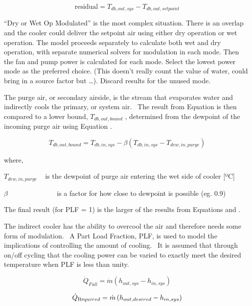 \begin{equation}
\text{residual} = T_{db,out,sys} - T_{db,out,setpoint}
\end{equation}

``Dry or Wet Op Modulated'' is the most complex situation. There is an overlap and the cooler could deliver the setpoint air using either dry operation or wet operation. The model proceeds separately to calculate both wet and dry operation, with separate numerical solvers for modulation in each mode. Then the fan and pump power is calculated for each mode. Select the lowest power mode as the preferred choice. (This doesn't really count the value of water, could bring in a source factor but \ldots{}). Discard results for the unused mode.

The purge air, or secondary airside, is the stream that evaporates water and indirectly cools the primary, or system air.~ The result from Equation is then compared to a lower bound, \({T_{db,out,bound}}\) , determined from the dewpoint of the incoming purge air using Equation .

\begin{equation}
{T_{db,out,bound}} = {T_{db,in,sys}} - \beta ({T_{db,in,sys}} - {T_{dew,in,purge}})
\end{equation}

where,

\({T_{dew,in,purge}}\) ~ is the dewpoint of purge air entering the wet side of cooler {[}ºC{]}

\(\beta\) ~~~~~~~~~~~~~ is a factor for how close to dewpoint is possible (eg. 0.9)

The final result (for PLF = 1) is the larger of the results from Equations and .

The indirect cooler has the ability to overcool the air and therefore needs some form of modulation.~ A Part Load Fraction, PLF, is used to model the implications of controlling the amount of cooling.~ It is assumed that through on/off cycling that the cooling power can be varied to exactly meet the desired temperature when PLF is less than unity.

\begin{equation}
{\dot Q_{Full}} = \dot m\left( {{h_{out,sys}} - {h_{in,sys}}} \right)
\end{equation}

\begin{equation}
{\dot Q_{{\mathop{\rm Re}\nolimits} quired}} = \dot m\left( {{h_{out,desired}} - {h_{in,sys}}} \right)
\end{equation}

